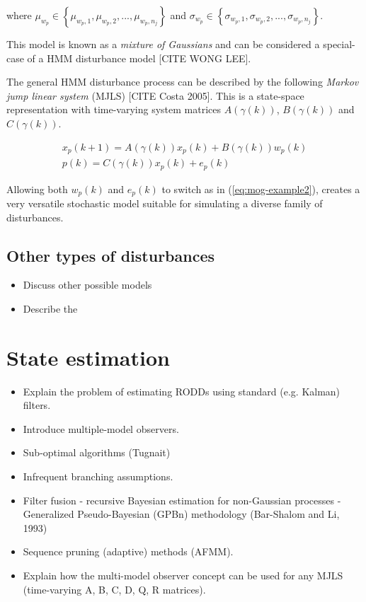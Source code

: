 where $\mu_{w_p}\in\left\{\mu_{w_p,1},\mu_{w_p,2},...,\mu_{w_p,n_j}\right\}$ and $\sigma_{w_p}\in\left\{\sigma_{w_p,1},\sigma_{w_p,2},...,\sigma_{w_p,n_j}\right\}$.

This model is known as a \textit{mixture of Gaussians} and can be considered a special-case of a HMM disturbance model [CITE WONG LEE].

The general HMM disturbance process can be described by the following \textit{Markov jump linear system} (MJLS) [CITE Costa 2005]. This is a state-space representation with time-varying system matrices $A(\gamma(k))$, $B(\gamma(k))$ and $C(\gamma(k))$.

\begin{equation} \label{eq:HMM}
	\begin{split}
	x_p(k+1)= A(\gamma(k))x_p(k)+B(\gamma(k))w_p(k) \\
	p(k)=C(\gamma(k))x_p(k) + e_p(k)
	\end{split}
\end{equation}

Allowing both $w_p(k)$ and $e_p(k)$ to switch as in (\ref{eq:mog-example2}), creates a very versatile stochastic model suitable for simulating a diverse family of disturbances.


\subsection{Other types of disturbances}

\begin{itemize}
	\item Discuss other possible models
	\item Describe the 
\end{itemize}



\section{State estimation}

\begin{itemize}
	\item Explain the problem of estimating RODDs using standard (e.g. Kalman) filters.
	\item Introduce multiple-model observers.
	\item Sub-optimal algorithms (Tugnait)
	\item Infrequent branching assumptions.
	\item Filter fusion - recursive Bayesian estimation for non-Gaussian processes - Generalized Pseudo-Bayesian (GPBn) methodology (Bar-Shalom and Li, 1993)
	\item Sequence pruning (adaptive) methods (AFMM).
	\item Explain how the multi-model observer concept can be used for any MJLS (time-varying A, B, C, D, Q, R matrices).
\end{itemize}

